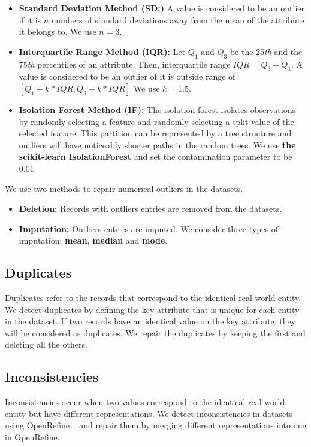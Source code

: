 \begin{itemize}
	\item {\textbf{Standard Deviation Method (SD:)}
		A value is considered to be an outlier if it is $n$ numbers of standard deviations away from the mean of the attribute it belongs to. We use $ n = 3 $.
	}
	\item {\textbf{Interquartile Range Method (IQR):} Let $Q_{1}$ and $Q_{3}$ be the 25\textit{th} and the 75\textit{th} percentiles of an attribute. Then, interquartile range 
		$ IQR = Q_{3} - Q_{1} $. A value is considered to be an outlier of it is outside range
		of $ [Q_{1} - k * IQR, Q_{3} + k * IQR] $ We use $ k = 1.5$.
	}
	\item{\textbf{Isolation Forest Method (IF):}
		The isolation forest isolates observations by randomly selecting a feature and randomly selecting a
		split value of the selected feature. This partition can be represented by a tree structure and outliers will have noticeably shorter
		paths in the random trees. We use \textbf{the scikit-learn IsolationForest}
		and set the contamination parameter to be $\mathbf{0.01}$
	}
\end{itemize}
We use two methods to repair numerical outliers in the datasets.
\begin{itemize}
	\item {
		\textbf{Deletion:} Records with outliers entries are removed from the datasets.
	}
	\item {
		\textbf{Imputation:} Outliers entries are imputed. We consider three
		types of imputation:  \textbf{mean}, \textbf{median} and \textbf{mode}.
	}
\end{itemize}

\subsection{Duplicates}
Duplicates refer to the records that correspond to the identical
real-world entity. We detect duplicates by defining the key attribute
that is unique for each entity in the dataset. If two records have an
identical value on the key attribute, they will be considered as duplicates. We repair the duplicates by keeping the first and deleting all the others.

\subsection{Inconsistencies}
Inconsistencies occur when two values correspond to the identical real-world entity but have different representations. 
We detect inconsistencies in datasets using OpenRefine ~\cite{Verborgh2013} and repair them by merging different representations into one in OpenRefine.

